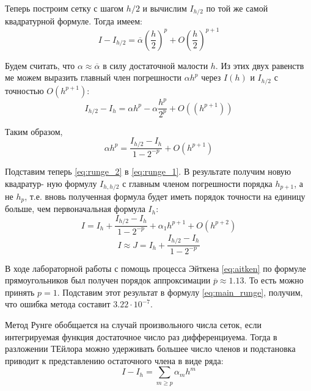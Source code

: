 \documentclass[a4paper, fontsize=14pt]{article}
\begin{document}
Теперь построим сетку с шагом $h / 2$ и вычислим $I_{h/2}$ по той же самой квадратурной формуле.
Тогда имеем:
\begin{equation*}
    I - I_{h/2} = \overline{\alpha} \left( \frac{h}{2} \right)^p + O\left( \frac{h}{2} \right)^{p+1}
\end{equation*}


Будем считать, что $\alpha \approx \overline{\alpha}$ в силу достаточной малости $h$. Из этих двух равенств ме
можем выразить главный член погрешности $\alpha h^p$ через $I(h)$ и $I_{h/2}$ с точностью $O(h^{p+1})$:
\begin{equation*}
    I_{h/2} - I_h = \alpha h^p - \alpha \frac{h^p}{2^p} + O\left(\left(h^{p+1}\right)\right)
\end{equation*}

Таким образом,
\begin{equation}
    \label{eq:runge_2}
    \alpha h^p = \frac{I_{h/2} - I_h}{1 - 2^{-p}} + O(h^{p+1})
\end{equation}

Подставим теперь \eqref{eq:runge_2} в \eqref{eq:runge_1}. В результате получим новую квадратур-
ную формулу $I_{h,h/2}$ с главным членом погрешности порядка $h_{p+1}$, а не $h_p$,
т.е. вновь полученная формула будет иметь порядок точности на единицу
больше, чем первоначальная формула $I_h$:
\begin{equation*}
        I = I_h + \frac{I_{h/2} - I_h}{1 - 2^{-p}} + \alpha_1 h^{p+1} + O \left(h^{p+2}\right)
\end{equation*}
\begin{equation}
    \label{eq:main_runge}
    I \approx J = I_h + \frac{I_{h/2} - I_h}{1 - 2^{-p}} 
\end{equation}

В ходе лабораторной работы с помощь процесса Эйткена \eqref{eq:aitken} по формуле прямоугольников 
был получен порядок аппроксимации $\overline{p} \approx 1.13$. 
То есть можно принять $p = 1$. Подставим этот результат в формулу \eqref{eq:main_runge}, получим, что ошибка метода составит $3.22\cdot10^{-7}$.

Метод Рунге обобщается на случай произвольного числа сеток, если интегрируемая функция достаточное число раз дифференциуема. Тогда в разложении ТЕйлора можно удерживать большее число членов и подстановка приводит к  представлению остаточного члена в виде ряда:
    \begin{equation*}
        I - I_h = \sum_{m \geq p} \alpha_m h^m 
    \end{equation*}
\end{document}

